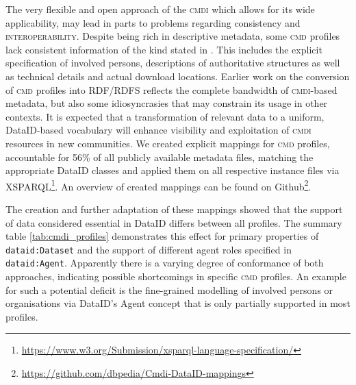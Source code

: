 \documentclass[runningheads,a4paper]{llncs}
\newcommand{\extensibility}{{\scshape extensibility}\xspace}
\newcommand{\interoperability}{{\scshape interoperability}\xspace}
\newcommand{\cmdi}{{\scshape cmdi}\xspace}
\newcommand{\cmd}{{\scshape cmd}\xspace}
\newcommand{\prop}[1]{{{\texttt{#1}}}}
\newcommand\footnoteurl[1]{\footnote{\scriptsize\url{#1}}}
\begin{document}
The very flexible and open approach of the \cmdi which allows for its wide applicability, may lead in parts to problems regarding
consistency and \interoperability.
Despite being rich in descriptive metadata, some \cmd profiles lack consistent information of the kind stated in . This includes the explicit specification of involved persons, descriptions of authoritative structures as well as technical details and actual download locations.
Earlier work on the conversion of \cmd profiles into RDF/RDFS\cite{DW2014} reflects the complete bandwidth of \cmdi-based metadata, but also some idiosyncrasies that may constrain its usage in other contexts. It is expected that a transformation of relevant data to a uniform, DataID-based vocabulary will enhance visibility and exploitation of \cmdi resources in new communities.
We created explicit mappings for \cmd profiles, accountable for 56\% of all publicly available metadata files, matching the appropriate DataID classes and applied them on all respective instance files via XSPARQL\footnoteurl{https://www.w3.org/Submission/xsparql-language-specification/}. An overview of created mappings can be found on Github\footnoteurl{https://github.com/dbpedia/Cmdi-DataID-mappings}.

The creation and further adaptation of these mappings showed that the support of data considered essential in DataID differs between all profiles. The summary table \ref{tab:cmdi_profiles} demonstrates this effect for primary properties of \prop{dataid:Dataset} and the support of different agent roles specified in \prop{dataid:Agent}. Apparently there is a varying degree of conformance of both approaches, indicating possible shortcomings in specific \cmd profiles. An example for such a potential deficit is the fine-grained modelling of involved persons or organisations via DataID's Agent concept that is only partially supported in most profiles.
\end{document}
